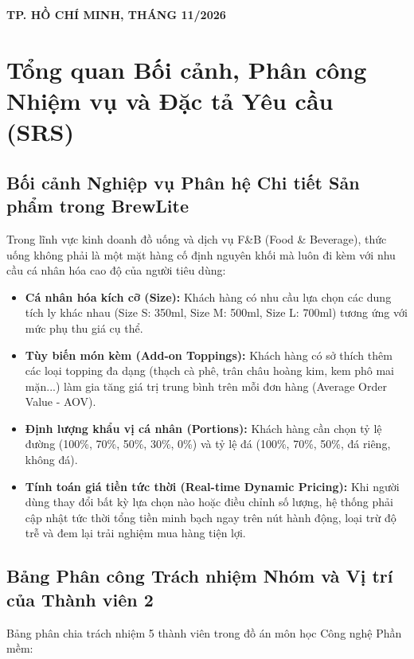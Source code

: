 \documentclass[a4paper]{article}
\begin{document}
\begin{titlepage}
\begin{singlespace}
\vfill
\begin{center}
{\small \textbf{TP. HỒ CHÍ MINH, THÁNG 11/2026}}
\end{center}
\end{singlespace}
\end{titlepage}

\thispagestyle{empty}
\newpage

\tableofcontents
\newpage

\onehalfspacing

\section{Tổng quan Bối cảnh, Phân công Nhiệm vụ và Đặc tả Yêu cầu (SRS)}

\subsection{Bối cảnh Nghiệp vụ Phân hệ Chi tiết Sản phẩm trong BrewLite}
Trong lĩnh vực kinh doanh đồ uống và dịch vụ F\&B (Food \& Beverage), thức uống không phải là một mặt hàng cố định nguyên khối mà luôn đi kèm với nhu cầu cá nhân hóa cao độ của người tiêu dùng:
\begin{itemize}
    \item \textbf{Cá nhân hóa kích cỡ (Size):} Khách hàng có nhu cầu lựa chọn các dung tích ly khác nhau (Size S: 350ml, Size M: 500ml, Size L: 700ml) tương ứng với mức phụ thu giá cụ thể.
    \item \textbf{Tùy biến món kèm (Add-on Toppings):} Khách hàng có sở thích thêm các loại topping đa dạng (thạch cà phê, trân châu hoàng kim, kem phô mai mặn...) làm gia tăng giá trị trung bình trên mỗi đơn hàng (Average Order Value - AOV).
    \item \textbf{Định lượng khẩu vị cá nhân (Portions):} Khách hàng cần chọn tỷ lệ đường (100\%, 70\%, 50\%, 30\%, 0\%) và tỷ lệ đá (100\%, 70\%, 50\%, đá riêng, không đá).
    \item \textbf{Tính toán giá tiền tức thời (Real-time Dynamic Pricing):} Khi người dùng thay đổi bất kỳ lựa chọn nào hoặc điều chỉnh số lượng, hệ thống phải cập nhật tức thời tổng tiền minh bạch ngay trên nút hành động, loại trừ độ trễ và đem lại trải nghiệm mua hàng tiện lợi.
\end{itemize}

\subsection{Bảng Phân công Trách nhiệm Nhóm và Vị trí của Thành viên 2}
Bảng phân chia trách nhiệm 5 thành viên trong đồ án môn học Công nghệ Phần mềm:
\end{document}
